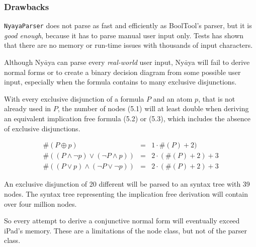 \subsubsection{Drawbacks}

\verb+NyayaParser+ does not parse as fast and efficiently as BoolTool's parser, but it is 
{\em good enough}, because it has to parse manual user input only.
Tests has shown that there are no memory or run-time issues with thousands of input characters.

Although Ny$\bar{a}$ya can parse every {\em real-world} user input,
Ny$\bar{a}$ya will fail to derive normal forms or to create a binary decision diagram from some possible user input,
especially when the formula contains to many exclusive disjunctions.

With every exclusive disjunction of a formula $P$ and an atom $p$, 
that is not already used in $P$,
the number of nodes (5.1) will at least double 
when deriving an equivalent implication free formula  (5.2) or (5.3), 
which includes the absence of exclusive disjunctions.

\begin{eqnarray}
\#(P \oplus p) & = & 1 \cdot\#(P) + 2) \\
\#((P \wedge \neg p) \vee  (\neg P \wedge p)) & = & 2 \cdot (\#(P) + 2) + 3 \\
\#((P \vee p) \wedge  (\neg P \vee \neg p)) & = & 2 \cdot (\#(P) + 2) + 3
\end{eqnarray}

An exclusive disjunction of 20 different will be parsed to an syntax tree with 39 nodes.
The syntax tree representing the implication free derivation will contain over four million nodes.



So every attempt to derive a conjunctive normal form 
will eventually exceed iPad's memory.
These are a limitations of the node class, but not of the parser class.

